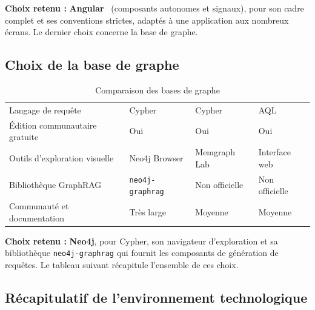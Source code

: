 \noindent\textbf{Choix retenu :} \textbf{Angular}~\cite{angular} (composants autonomes et signaux), pour son cadre complet et ses conventions strictes, adaptés à une application aux nombreux écrans. Le dernier choix concerne la base de graphe.

\subsection{Choix de la base de graphe}

\begin{table}[H]
\centering
\small
\begin{tabular}{|L{3.8cm}|L{3.3cm}|L{3.3cm}|L{3.4cm}|}
\hline
{} &  &  &  \\ \hline
Langage de requête & Cypher & Cypher & AQL \\ \hline
Édition communautaire gratuite & Oui & Oui & Oui \\ \hline
Outils d'exploration visuelle & Neo4j Browser & Memgraph Lab & Interface web \\ \hline
Bibliothèque GraphRAG & \texttt{neo4j-graphrag} & Non officielle & Non officielle \\ \hline
Communauté et documentation & Très large & Moyenne & Moyenne \\ \hline
\end{tabular}
\caption{Comparaison des bases de graphe}
\label{tab:cmp-graph}
\end{table}

\noindent\textbf{Choix retenu :} \textbf{Neo4j}, pour Cypher, son navigateur d'exploration et sa bibliothèque \texttt{neo4j-graphrag} qui fournit les composants de génération de requêtes. Le tableau suivant récapitule l'ensemble de ces choix.

\subsection{Récapitulatif de l'environnement technologique}

